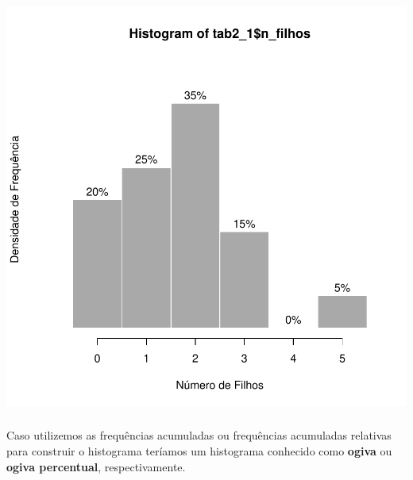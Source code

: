 \documentclass[14pt,aspectratio=1610]{beamer}
\begin{document}
\begin{frame}{}
\frametitle{}
\begin{block}{}

\begin{center}
\includegraphics{Aula1-hist2}
\end{center}
\end{block}
\end{frame}


\begin{frame}{}
\frametitle{}
\begin{block}{}
\justifying
Caso utilizemos as frequências acumuladas ou frequências acumuladas relativas para construir o histograma teríamos um histograma conhecido como {\bf ogiva} ou {\bf ogiva percentual}, respectivamente.
\end{block}
\end{frame}
\end{document}
